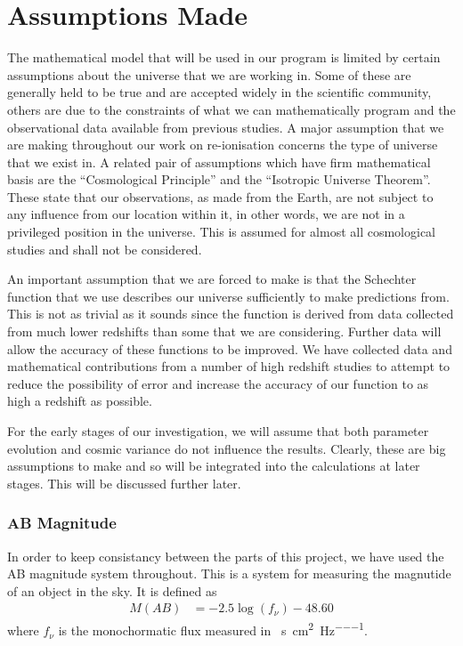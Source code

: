 
\section{Assumptions Made} %
\label{sec:assumptions_made}
	The mathematical model that will be used in our program is limited by certain assumptions about the universe that we are working in. Some of these are generally held to be true and are accepted widely in the scientific community, others are due to the constraints of what we can mathematically program and the observational data available from previous studies. A major assumption that we are making throughout our work on re-ionisation concerns the type of universe that we exist in. A related pair of assumptions which have firm mathematical basis are the ``Cosmological Principle'' and the ``Isotropic Universe Theorem''. These state that our observations, as made from the Earth, are not subject to any influence from our location within it, in other words, we are not in a privileged position in the universe. This is assumed for almost all cosmological studies and shall not be considered.

	An important assumption that we are forced to make is that the Schechter function that we use describes our universe sufficiently to make predictions from. This is not as trivial as it sounds since the function is derived from data collected from much lower redshifts than some that we are considering. Further data will allow the accuracy of these functions to be improved. We have collected data and mathematical contributions from a number of high redshift studies to attempt to reduce the possibility of error and increase the accuracy of our function to as high a redshift as possible.

	For the early stages of our investigation, we will assume that both parameter evolution and cosmic variance do not influence the results. Clearly, these are big assumptions to make and so will be integrated into the calculations at later stages. This will be discussed further later.

	\subsubsection{AB Magnitude} %
	\label{ssub:ab_magnitude}
		In order to keep consistancy between the parts of this project, we have used the AB magnitude system throughout. This is a system for measuring the magnutide of an object in the sky. It is defined as
		\begin{align}
			M(AB) &= -2.5\log(f_\nu) -48.60
		\end{align}
		where $f_\nu$ is the monochormatic flux measured in \si{\erg\per\second\per\square\centi\metre\per\hertz}.


